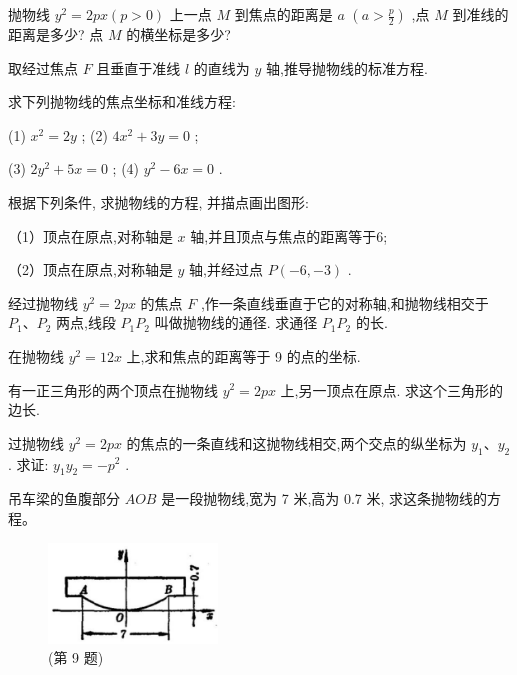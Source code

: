 \documentclass[lang=cn,newtx,10pt,scheme=chinese]{elegantbook}
\begin{document}
\begin{problemset}[习 题 八]

\item 抛物线 \({y}^{2} = {2px}\left( {p > 0}\right)\) 上一点 \(M\) 到焦点的距离是 \(a\) \(\left( {a > \frac{p}{2}}\right)\) ,点 \(M\) 到准线的距离是多少? 点 \(M\) 的横坐标是多少?

\item 取经过焦点 \(F\) 且垂直于准线 \(l\) 的直线为 \(y\) 轴,推导抛物线的标准方程.

\item 求下列抛物线的焦点坐标和准线方程:

(1) \({x}^{2} = {2y}\) ; (2) \(4{x}^{2} + {3y} = 0\) ;

(3) \(2{y}^{2} + {5x} = 0\) ; (4) \({y}^{2} - {6x} = 0\) .

\item 根据下列条件, 求抛物线的方程, 并描点画出图形:

（1）顶点在原点,对称轴是 \(x\) 轴,并且顶点与焦点的距离等于6;

（2）顶点在原点,对称轴是 \(y\) 轴,并经过点 \(P\left( {-6, - 3}\right)\) .

\item 经过抛物线 \({y}^{2} = {2px}\) 的焦点 \(F\) ,作一条直线垂直于它的对称轴,和抛物线相交于 \({P}_{1}\text{、}{P}_{2}\) 两点,线段 \({P}_{1}{P}_{2}\) 叫做抛物线的通径. 求通径 \({P}_{1}{P}_{2}\) 的长.

\item 在抛物线 \({y}^{2} = {12x}\) 上,求和焦点的距离等于 9 的点的坐标.

\item 有一正三角形的两个顶点在抛物线 \({y}^{2} = {2px}\) 上,另一顶点在原点. 求这个三角形的边长.

\item 过抛物线 \({y}^{2} = {2px}\) 的焦点的一条直线和这抛物线相交,两个交点的纵坐标为 \({y}_{1}\text{、}{y}_{2}\) . 求证: \({y}_{1}{y}_{2} = - {p}^{2}\) .

\item 吊车梁的鱼腹部分 \({AOB}\) 是一段抛物线,宽为 7 米,高为 0.7 米, 求这条抛物线的方程。

\begin{figure}[h]
  \centering
  \includegraphics[max width=0.4\textwidth]{images/01912cc2-ffb6-728e-9ae7-b113ff05c64b_116_689484.jpg}
  \caption{(第 9 题)}
\end{figure}




\end{problemset}
\end{document}
